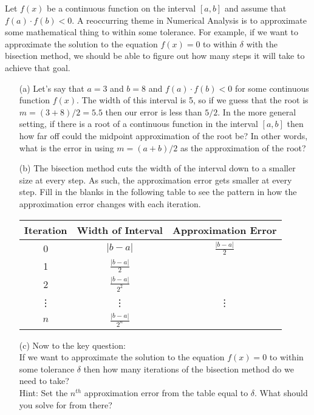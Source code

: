 \begin{problem}
    Let $f(x)$ be a continuous function on the interval $[a,b]$ and assume that $f(a)
    \cdot f(b) <0$.  A reoccurring theme in Numerical Analysis is to approximate some
    mathematical thing to within some tolerance.  For example, if we want to approximate the solution to the equation $f(x)=0$ to
    within $\delta$ with the bisection method, we should be able to figure out how many
    steps it will take to achieve that goal.
    \begin{enumerate}
        \item[(a)] Let's say that $a = 3$ and $b = 8$ and $f(a) \cdot f(b) < 0$ for some
            continuous function $f(x)$.  The width of this interval is 5, so if we guess
            that the root is $m=(3+8)/2 = 5.5$ then our error is less than $5/2$.  In the more
            general setting, if there is a root of a continuous function in the interval
            $[a,b]$ then how far off could the midpoint approximation of the root be?  In
            other words, what is the error in using $m=(a+b)/2$ as the approximation of
            the root?
        \item[(b)] The bisection method cuts the width of the interval down to
            a smaller size at every step. As such, the approximation error gets smaller at
            every step.  Fill in the blanks in the following table to see the pattern in
            how the approximation error changes with each iteration.
            \begin{center}
                \begin{tabular}{|c|c|c|}
                    \hline
                    Iteration & Width of Interval & Approximation Error \\ \hline \hline
                    0 & $|b-a|$ & $\frac{|b-a|}{2}$ \\\hline
                    1 & $\frac{|b-a|}{2}$ &  \\\hline
                    2 & $\frac{|b-a|}{2^2}$ &  \\\hline
                    \vdots & \vdots & \vdots \\\hline
                    $n$ & $\frac{|b-a|}{2^n}$ &  \\
                    \hline
                \end{tabular}
            \end{center}
        \item[(c)] Now to the key question: \\
            If we want to approximate the solution to the equation $f(x)=0$ to within some
            tolerance $\delta$ then how many iterations of the bisection method do we need
            to take? \\
            Hint: Set the $n^{th}$ approximation error from the table equal to $\delta$.
            What should you solve for from there?
    \end{enumerate}
\end{problem}
